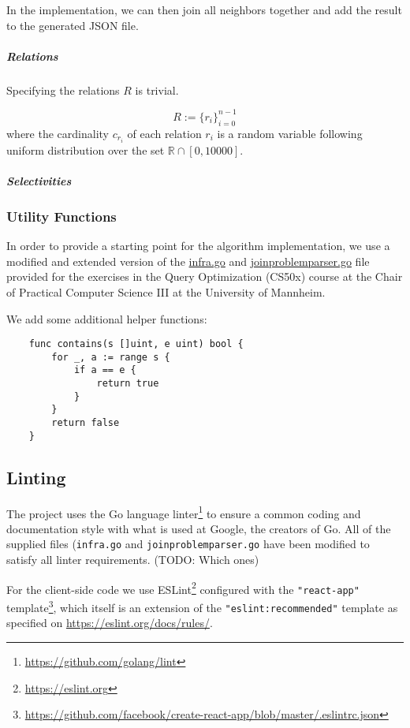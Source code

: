 In the implementation, we can then join all neighbors together and add the result to the generated JSON file.
\begin{equation}
\end{equation}

\subparagraph{Relations}
Specifying the relations $R$ is trivial. 

\begin{equation}
R := \{r_i\}_{i=0}^{n-1}
\end{equation}
where the cardinality $c_{r_i}$ of each relation $r_i$ is a random variable following uniform distribution over the set $\mathbb{R} \cap [0,10000]$.

\subparagraph{Selectivities}



\subsubsection{Utility Functions}


In order to provide a starting point for the algorithm implementation, we use a modified and extended version of the \url{infra.go} and \url{joinproblemparser.go} file provided for the exercises in the Query Optimization (CS50x) course \texttt{} at the Chair of Practical Computer Science III at the University of Mannheim.

We add some additional helper functions:
\begin{verbatim}   
    func contains(s []uint, e uint) bool {
        for _, a := range s {
            if a == e {
                return true
            }
        }
        return false
    }    
\end{verbatim}

\subsection{Linting}
The project uses the Go language linter\footnote{\url{https://github.com/golang/lint}} to ensure a common coding and documentation style with what is used at Google, the creators of Go.
All of the supplied files (\texttt{infra.go} and \texttt{joinproblemparser.go} have been modified to satisfy all linter requirements. (TODO: Which ones)

For the client-side code we use ESLint\footnote{\url{https://eslint.org}} configured with the \texttt{"react-app"} template\footnote{\url{https://github.com/facebook/create-react-app/blob/master/.eslintrc.json}}, which itself is an extension of the \texttt{"eslint:recommended"} template as specified on \url{https://eslint.org/docs/rules/}.

